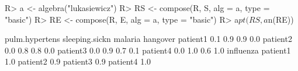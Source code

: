 \begin{Schunk}
% --begin: "comp.circ.excl"
\begin{Sinput}
R> a <- algebra("lukasiewicz")
R> RS <- compose(R, S, alg = a, type = "basic")
R> RE <- compose(R, E, alg = a, type = "basic")
R> a$pt(RS, a$n(RE))
\end{Sinput}
\begin{Soutput}
         pulm.hypertens sleeping.sickn malaria hangover
patient1            0.1            0.9     0.9      0.0
patient2            0.0            0.8     0.8      0.0
patient3            0.0            0.9     0.7      0.1
patient4            0.0            1.0     0.6      1.0
         influenza
patient1       1.0
patient2       0.9
patient3       0.9
patient4       1.0
\end{Soutput}
%
% --end: "comp.circ.excl"
\end{Schunk}

